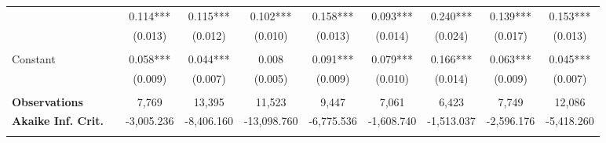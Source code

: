 \begin{tabular*}{\linewidth}{@{\extracolsep{\fill} } llcccccccc}
\hline%
\arrayrulecolor{white}%
\hline%
\arrayrulecolor{white}%
\hline%
\arrayrulecolor{white}%
\hline%
\multirow{2}{*}{\hspace{0.2cm}500+}&&0.114***&0.115***&0.102***&0.158***&0.093***&0.240***&0.139***&0.153***\\%
&&(0.013)&(0.012)&(0.010)&(0.013)&(0.014)&(0.024)&(0.017)&(0.013)\\%
\arrayrulecolor{white}%
\hline%
\arrayrulecolor{white}%
\hline%
\arrayrulecolor{white}%
\hline%
\arrayrulecolor{white}%
\hline%
\arrayrulecolor{white}%
\hline%
&&&&&&&&&\\%
\multirow{2}{*}{Constant}&&0.058***&0.044***&0.008&0.091***&0.079***&0.166***&0.063***&0.045***\\%
&&(0.009)&(0.007)&(0.005)&(0.009)&(0.010)&(0.014)&(0.009)&(0.007)\\%
\arrayrulecolor{white}%
\hline%
\arrayrulecolor{white}%
\hline%
\arrayrulecolor{white}%
\hline%
\arrayrulecolor{white}%
\hline%
\arrayrulecolor{white}%
\hline%
&&&&&&&&&\\%
\bfseries Observations&&7,769&13,395&11,523&9,447&7,061&6,423&7,749&12,086\\%
\bfseries Akaike Inf. Crit.&&{-}3,005.236&{-}8,406.160&{-}13,098.760&{-}6,775.536&{-}1,608.740&{-}1,513.037&{-}2,596.176&{-}5,418.260\\%
\arrayrulecolor{white}%
\hline%
\arrayrulecolor{white}%
\hline%
\arrayrulecolor{white}%
\hline%
\arrayrulecolor{white}%
\hline%
\arrayrulecolor{white}%
\hline%
\arrayrulecolor{black}%
\hline%
\end{tabular*}